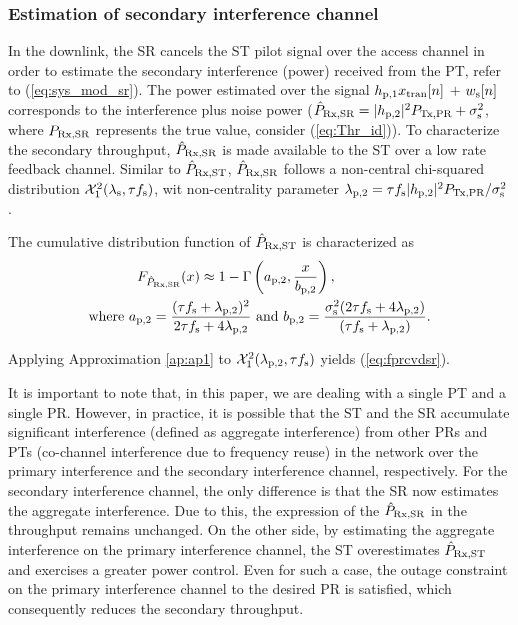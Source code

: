 \subsubsection{Estimation of secondary interference channel}
In the downlink, the SR cancels the ST pilot signal over the access channel in order to estimate the secondary interference (power) received from the PT, refer to (\ref{eq:sys_mod_sr}). The power estimated over the signal $h_{\text{p,1}} x_{\text{tran}}[n]$ $+$ $w_{\text{s}}[n]$ corresponds to the interference plus noise power ($\hat{P}_{\text{Rx,SR}} = |h_{\text{p,2}}|^2 P_{\text{Tx,PR}} + \sigma^2_{\text{s}}$, where $P_{\text{Rx,SR}}$ represents the true value, consider (\ref{eq:Thr_id})). To characterize the secondary throughput, $\hat{P}_{\text{Rx,SR}}$ is made available to the ST over a low rate feedback channel. Similar to $\hat{P}_{\text{Rx,ST}}$, $\hat{P}_{\text{Rx,SR}}$ follows a non-central chi-squared distribution $\ncchi2(\ls, \tau \fsam)$, wit non-centrality parameter $\lambda_{\text{p,2}} = \tau f_{\text{s}} |h_{\text{p,2}}|^2 P_{\text{Tx,PR}} / \sigma^2_{\text{s}}$.
\begin{lemma} \label{lm:lm3}
\normalfont
The cumulative distribution function of $\hat{P}_{\text{Rx,ST}}$ is characterized as 
\begin{align}
F_{\hat{P}_{\text{Rx,SR}}}(x) \approx 1 - \Gamma&\left(a_{\text{p,2}}, \frac{x}{b_{\text{p,2}}}\right) \label{eq:fprcvdsr}, \\ 
\text{where  } a_{\text{p,2}} = \frac{(\tau f_{\text{s}} + \lambda_{\text{p,2}})^2}{2 \tau f_{\text{s}} + 4 \lambda_{\text{p,2}}} &\text{ and } b_{\text{p,2}} = \frac{\sigma^2_{\text{s}} (2 \tau f_{\text{s}} + 4 \lambda_{\text{p,2}})}{(\tau f_{\text{s}} + \lambda_{\text{p,2}})}.  \label{eq:para_pt} 
\end{align} 
\end{lemma}
\begin{IEEEproof}
Applying Approximation \ref{ap:ap1} to $\ncchi2(\lpt, \tau \fsam)$ yields (\ref{eq:fprcvdsr}). 
\end{IEEEproof}
It is important to note that, in this paper, we are dealing with a single PT and a single PR. However, in practice, it is possible that the ST and the SR accumulate significant interference (defined as aggregate interference) from other PRs and PTs (co-channel interference due to frequency reuse) in the network\cite{Elsawy13_cmag,Kaushik14_P} over the primary interference and the secondary interference channel, respectively. For the secondary interference channel, the only difference is that the SR now estimates the aggregate interference. Due to this, the expression of the $\hat{P}_{\text{Rx,SR}}$ in the throughput remains unchanged. On the other side, by estimating the aggregate interference on the primary interference channel, the ST overestimates $\hat{P}_{\text{Rx,ST}}$ and exercises a greater power control. Even for such a case, the outage constraint on the primary interference channel to the desired PR is satisfied, which consequently reduces the secondary throughput.  


